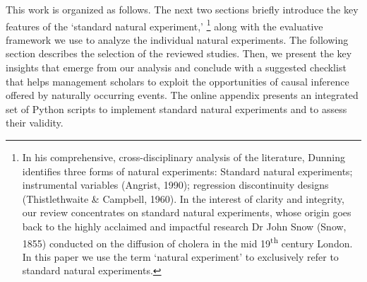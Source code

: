 


This work is organized as follows. The next two sections briefly introduce the
key features of the `standard natural experiment,' \footnote{In his
comprehensive, cross-disciplinary analysis of the literature, Dunning
\citeyear[][]{dunning2012} identifies three forms of natural experiments:
Standard natural experiments; instrumental variables (Angrist, 1990); regression
discontinuity designs (Thistlethwaite \& Campbell, 1960). In the interest of
clarity and integrity, our review concentrates on standard natural experiments,
whose origin goes back to the highly acclaimed and impactful research Dr John
Snow (Snow, 1855) conducted on the diffusion of cholera in the mid
19\textsuperscript{th} century London. In this paper we use the term `natural
experiment' to exclusively refer to standard natural experiments.} along with
the evaluative framework we use to analyze the individual natural experiments.
The following section describes the selection of the reviewed studies. Then, we
present the key insights that emerge from our analysis and conclude with a
suggested checklist that helps management scholars to exploit the opportunities
of causal inference offered by naturally occurring events. The online appendix
presents an integrated set of Python scripts to implement standard natural
experiments and to assess their validity.
